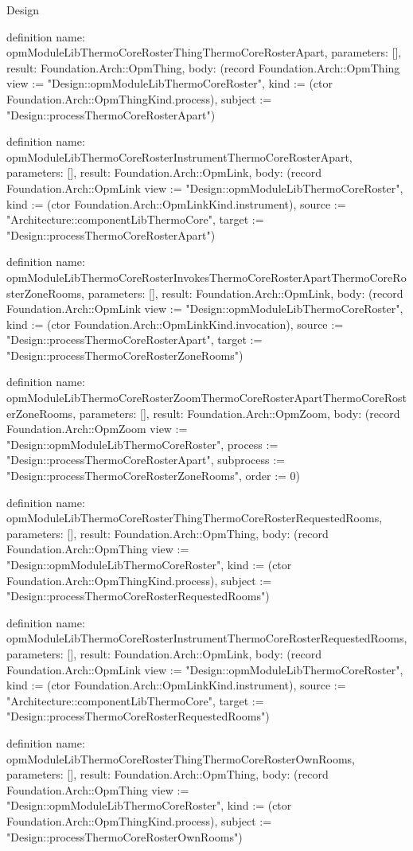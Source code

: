 \begin{lexlean}{Design}
\begin{semanticmodule}
definition{
  name: opmModuleLibThermoCoreRosterThingThermoCoreRosterApart,
  parameters: [],
  result: Foundation.Arch::OpmThing,
  body: (record Foundation.Arch::OpmThing {view := "Design::opmModuleLibThermoCoreRoster", kind := (ctor Foundation.Arch::OpmThingKind.process), subject := "Design::processThermoCoreRosterApart"})
}

definition{
  name: opmModuleLibThermoCoreRosterInstrumentThermoCoreRosterApart,
  parameters: [],
  result: Foundation.Arch::OpmLink,
  body: (record Foundation.Arch::OpmLink {view := "Design::opmModuleLibThermoCoreRoster", kind := (ctor Foundation.Arch::OpmLinkKind.instrument), source := "Architecture::componentLibThermoCore", target := "Design::processThermoCoreRosterApart"})
}

definition{
  name: opmModuleLibThermoCoreRosterInvokesThermoCoreRosterApartThermoCoreRosterZoneRooms,
  parameters: [],
  result: Foundation.Arch::OpmLink,
  body: (record Foundation.Arch::OpmLink {view := "Design::opmModuleLibThermoCoreRoster", kind := (ctor Foundation.Arch::OpmLinkKind.invocation), source := "Design::processThermoCoreRosterApart", target := "Design::processThermoCoreRosterZoneRooms"})
}

definition{
  name: opmModuleLibThermoCoreRosterZoomThermoCoreRosterApartThermoCoreRosterZoneRooms,
  parameters: [],
  result: Foundation.Arch::OpmZoom,
  body: (record Foundation.Arch::OpmZoom {view := "Design::opmModuleLibThermoCoreRoster", process := "Design::processThermoCoreRosterApart", subprocess := "Design::processThermoCoreRosterZoneRooms", order := 0})
}

definition{
  name: opmModuleLibThermoCoreRosterThingThermoCoreRosterRequestedRooms,
  parameters: [],
  result: Foundation.Arch::OpmThing,
  body: (record Foundation.Arch::OpmThing {view := "Design::opmModuleLibThermoCoreRoster", kind := (ctor Foundation.Arch::OpmThingKind.process), subject := "Design::processThermoCoreRosterRequestedRooms"})
}

definition{
  name: opmModuleLibThermoCoreRosterInstrumentThermoCoreRosterRequestedRooms,
  parameters: [],
  result: Foundation.Arch::OpmLink,
  body: (record Foundation.Arch::OpmLink {view := "Design::opmModuleLibThermoCoreRoster", kind := (ctor Foundation.Arch::OpmLinkKind.instrument), source := "Architecture::componentLibThermoCore", target := "Design::processThermoCoreRosterRequestedRooms"})
}

definition{
  name: opmModuleLibThermoCoreRosterThingThermoCoreRosterOwnRooms,
  parameters: [],
  result: Foundation.Arch::OpmThing,
  body: (record Foundation.Arch::OpmThing {view := "Design::opmModuleLibThermoCoreRoster", kind := (ctor Foundation.Arch::OpmThingKind.process), subject := "Design::processThermoCoreRosterOwnRooms"})
}


\end{semanticmodule}
\end{lexlean}
